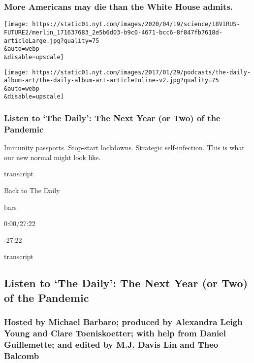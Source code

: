 \hypertarget{more-americans-may-die-than-the-white-house-admits}{%
\subsubsection{More Americans may die than the White House
admits.}\label{more-americans-may-die-than-the-white-house-admits}}

\texttt{[image: https://static01.nyt.com/images/2020/04/19/science/18VIRUS-FUTURE2/merlin\_171637683\_2e5b6d03-b9c0-4671-bcc6-8f847fb7618d-articleLarge.jpg?quality=75\\\&auto=webp\\\&disable=upscale]}

\texttt{[image: https://static01.nyt.com/images/2017/01/29/podcasts/the-daily-album-art/the-daily-album-art-articleInline-v2.jpg?quality=75\\\&auto=webp\\\&disable=upscale]}

\hypertarget{listen-to-the-daily-the-next-year-or-two-of-the-pandemic}{%
\subsubsection{Listen to `The Daily': The Next Year (or Two) of the
Pandemic}\label{listen-to-the-daily-the-next-year-or-two-of-the-pandemic}}

Immunity passports. Stop-start lockdowns. Strategic self-infection. This
is what our new normal might look like.

transcript

Back to The Daily

bars

0:00/27:22

-27:22

transcript

\hypertarget{listen-to-the-daily-the-next-year-or-two-of-the-pandemic-1}{%
\subsection{Listen to `The Daily': The Next Year (or Two) of the
Pandemic}\label{listen-to-the-daily-the-next-year-or-two-of-the-pandemic-1}}

\hypertarget{hosted-by-michael-barbaro-produced-by-alexandra-leigh-young-and-clare-toeniskoetter-with-help-from-daniel-guillemette-and-edited-by-mj-davis-lin-and-theo-balcomb}{%
\subsubsection{Hosted by Michael Barbaro; produced by Alexandra Leigh
Young and Clare Toeniskoetter; with help from Daniel Guillemette; and
edited by M.J. Davis Lin and Theo
Balcomb}\label{hosted-by-michael-barbaro-produced-by-alexandra-leigh-young-and-clare-toeniskoetter-with-help-from-daniel-guillemette-and-edited-by-mj-davis-lin-and-theo-balcomb}}

